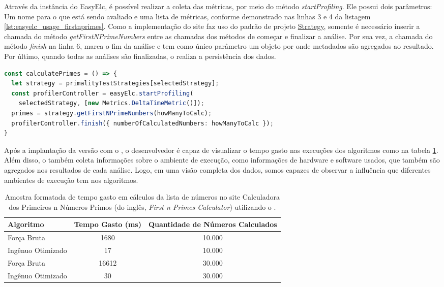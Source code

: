 \documentclass[12pt]{tcc}
\begin{document}
	Através da instância do EasyElc, é possível realizar a coleta das métricas, por meio do método \emph{startProfiling}.
	Ele possui dois parâmetros: Um nome para o que está sendo avaliado e uma lista de métricas, conforme demonstrado nas linhas 3 e 4 da listagem \ref{lst:easyelc_usage_firstnprimes}.
	Como a implementação do site faz uso do padrão de projeto \hyperref[subsection:strategy]{Strategy}, somente é necessário inserir a chamada do método \emph{getFirstNPrimeNumbers} entre as chamadas dos métodos de começar e finalizar a análise.
	Por sua vez, a chamada do método \emph{finish} na linha 6, marca o fim da análise e tem como único parâmetro um objeto por onde metadados são agregados ao resultado.
	Por último, quando todas as análises são finalizadas, o  realiza a persistência dos dados.

\begin{minipage}{\linewidth}
\begin{lstlisting}[label={lst:easyelc_usage_firstnprimes}, caption={Coleta de métricas usando o EasyElc no site Calculadora dos Primeiros n Números Primos.}, language=TypeScript, breaklines=true]
const calculatePrimes = () => {
  let strategy = primalityTestStrategies[selectedStrategy];
  const profilerController = easyElc.startProfiling(
    selectedStrategy, [new Metrics.DeltaTimeMetric()]);
  primes = strategy.getFirstNPrimeNumbers(howManyToCalc);
  profilerController.finish({ numberOfCalculatedNumbers: howManyToCalc });
}
\end{lstlisting}
\end{minipage}

	Após a implantação da versão com o , o desenvolvedor é capaz de visualizar o tempo gasto nas execuções dos algoritmos como na tabela \ref{table:resultado-easyelc}.
	Além disso, o  também coleta informações sobre o ambiente de execução, como informações de hardware e software usados, que também são agregados nos resultados de cada análise.
	Logo, em uma visão completa dos dados, somos capazes de observar a influência que diferentes ambientes de execução tem nos algoritmos.

	\begin{table}[!h]
		\centering
		\caption[Resultados do teste de cálculo de números primos]{Amostra formatada de tempo gasto em cálculos da lista de números no site Calculadora dos Primeiros n Números Primos (do inglês, \emph{First n Primes Calculator}) utilizando o .}
		\begin{tabular}{lcc}
			\hline
			Algoritmo & Tempo Gasto (ms) & Quantidade de Números Calculados \\
			\hline
			Força Bruta & 1680 & 10.000 \\
			Ingênuo Otimizado & 17 & 10.000 \\
			Força Bruta & 16612 & 30.000 \\
			Ingênuo Otimizado & 30 & 30.000 \\
			\hline
		\end{tabular}
		\label{table:resultado-easyelc}
	\end{table}
\end{document}
